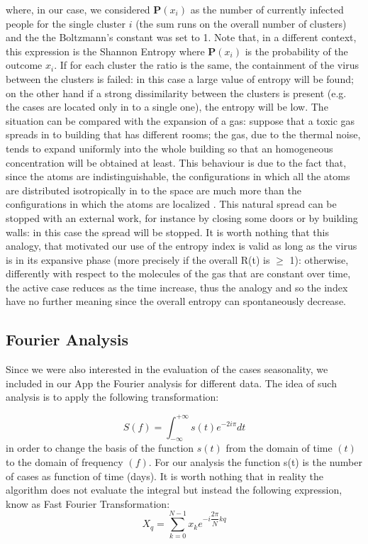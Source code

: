 \documentclass[
12pt, %
a4paper, %
oneside, %
headinclude,footinclude, %
BCOR5mm, %
]{scrartcl}
\begin{document}
where, in our case, we considered $\textbf{P}(x_{i})$ as the number of currently infected people for the single cluster $i$ (the sum runs on the overall number of clusters) and the the Boltzmann's constant was set to 1. Note that, in a different context, this expression is the Shannon Entropy where $\textbf{P}(x_{i})$ is the probability of the outcome $x_{i}$. If for each cluster the ratio is the same, the containment of the virus between the clusters is failed: in this case a large value of entropy will be found; on the other hand if a strong dissimilarity between the clusters is present (e.g. the cases are located only in to a single one), the entropy will be low. The situation can be compared with the expansion of a gas: suppose that a toxic gas spreads in to building that has different rooms; the gas, due to the thermal noise, tends to expand uniformly into the whole building so that an homogeneous concentration will be obtained at least. This behaviour is due to the fact that, since the atoms are indistinguishable, the configurations in which all the atoms are distributed isotropically in to the space are much more than the configurations in which the atoms are localized \cite{kittel1998thermal} .  This natural spread can be stopped with an external work, for instance by closing some doors or by building walls: in this case the spread will be stopped. It is worth nothing that this analogy, that motivated our use of the entropy index is valid as long as the virus is in its expansive phase (more precisely if the overall R(t) is $\geq $ 1): otherwise, differently with respect to the molecules of the gas that are constant over time, the active case reduces as the time increase, thus the analogy and so the index have no further meaning since the overall entropy can spontaneously decrease.


\subsection{Fourier Analysis}

Since we were also interested in the evaluation of the cases seasonality, we included in our App the Fourier analysis for different data. The idea of such analysis is to apply the following transformation: 

 \begin{equation}
S(f)=\int^{+\infty}_{-\infty}s(t)e^{-2i\pi}\textit{dt}
\end{equation}
in order to change the basis of the function $s(t)$ from the domain of time $(t)$ to the domain of frequency $(f)$. For our analysis the function s(t) is the number of cases as function of time (days). It is worth nothing that in reality the algorithm does not evaluate the integral but instead the following expression, know as Fast Fourier Transformation: 
 \begin{equation}
X_{q}=\sum^{N-1}_{k=0}x_{k}e^{-i\dfrac{2\pi}{N}kq}
\end{equation}
\end{document}
